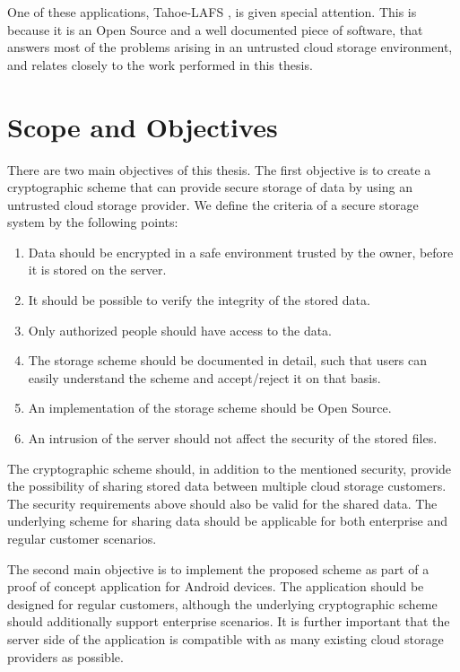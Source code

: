\documentclass[pdftex,english,10pt,b5paper,twoside]{book}
\begin{document}
One of these applications, Tahoe-\ac{LAFS} \cite{tahoe}, is given special
attention. This is because it is an Open Source and a well documented piece of
software, that answers most of the problems arising in an untrusted cloud
storage environment, and relates closely to the work performed in this thesis.

\section{Scope and Objectives}
\label{sec:criteria}

There are two main objectives of this thesis. The first objective is to create
a cryptographic scheme that can provide secure storage of data by using an
untrusted cloud storage provider. We define the criteria of a secure storage
system by the following points:

\begin{enumerate}
  \item Data should be encrypted in a safe environment trusted by the owner,
      before it is stored on the server.
  \item It should be possible to verify the integrity of the stored data.
  \item Only authorized people should have access to the data.
  \item The storage scheme should be documented in detail, such that users can
      easily understand the scheme and accept/reject it on that basis.
  \item An implementation of the storage scheme should be Open Source.
  \item An intrusion of the server should not affect the security of
      the stored files.
\end{enumerate}

The cryptographic scheme should, in addition to the mentioned security, provide
the possibility of sharing stored data between multiple cloud storage
customers. The security requirements above should also be valid for the shared
data. The underlying scheme for sharing data should be applicable for both
enterprise and regular customer scenarios.

The second main objective is to implement the proposed scheme as part of a
proof of concept application for Android devices. The application should be
designed for regular customers, although the underlying cryptographic scheme
should additionally support enterprise scenarios. It is further important that
the server side of the application is compatible with as many existing cloud
storage providers as possible.
\end{document}
